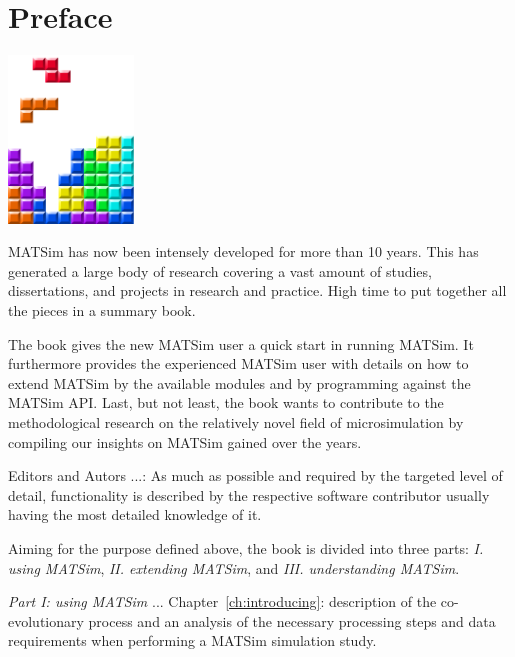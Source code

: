 \chapter*{Preface}

\begin{center} \includegraphics[width=0.25\textwidth, angle=0]{figures/MATSimBook.png} \end{center}

MATSim has now been intensely developed for more than 10 years. This has generated a large body of research covering a vast amount of studies, dissertations, and projects in research and practice. High time to put together all the pieces in a summary book.

The book gives the new MATSim user a quick start in running MATSim. It furthermore provides the experienced MATSim user with details on how to extend MATSim by the available modules and by programming against the MATSim API. Last, but not least, the book wants to contribute to the methodological research on the relatively novel field of microsimulation by compiling our insights on MATSim gained over the years. 


Editors and Autors ...: As much as possible and required by the targeted level of detail, functionality is described by the respective software contributor usually having the most detailed knowledge of it. 

Aiming for the purpose defined above, the book is divided into three parts: \emph{I. using MATSim}, \emph{II. extending MATSim}, and \emph{III. understanding MATSim}.

\emph{Part I: using MATSim} ... 
Chapter~\ref{ch:introducing}: description of the co-evolutionary process and an analysis of the necessary processing steps and data requirements when performing a MATSim simulation study. 

